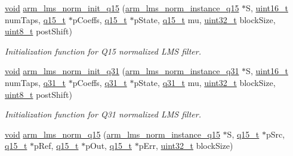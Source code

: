 \begin{DoxyCompactItemize}
\hyperlink{group___n_a_m_e_ga18028b8badbf1ea7e704ccac3c488e82}{void} \hyperlink{group___l_m_s___n_o_r_m_ga213ab1ee2e154cc2fa30d667b1994b89}{arm\-\_\-lms\-\_\-norm\-\_\-init\-\_\-q15} (\hyperlink{structarm__lms__norm__instance__q15}{arm\-\_\-lms\-\_\-norm\-\_\-instance\-\_\-q15} $\ast$S, \hyperlink{stdint_8h_a273cf69d639a59973b6019625df33e30}{uint16\-\_\-t} num\-Taps, \hyperlink{arm__math_8h_ab5a8fb21a5b3b983d5f54f31614052ea}{q15\-\_\-t} $\ast$p\-Coeffs, \hyperlink{arm__math_8h_ab5a8fb21a5b3b983d5f54f31614052ea}{q15\-\_\-t} $\ast$p\-State, \hyperlink{arm__math_8h_ab5a8fb21a5b3b983d5f54f31614052ea}{q15\-\_\-t} mu, \hyperlink{stdint_8h_a435d1572bf3f880d55459d9805097f62}{uint32\-\_\-t} block\-Size, \hyperlink{stdint_8h_aba7bc1797add20fe3efdf37ced1182c5}{uint8\-\_\-t} post\-Shift)
\begin{DoxyCompactList}\small\item\em Initialization function for Q15 normalized L\-M\-S filter. \end{DoxyCompactList}\item 
\hyperlink{group___n_a_m_e_ga18028b8badbf1ea7e704ccac3c488e82}{void} \hyperlink{group___l_m_s___n_o_r_m_ga1d9659dbbea4c89a7a9d14d5fc0dd490}{arm\-\_\-lms\-\_\-norm\-\_\-init\-\_\-q31} (\hyperlink{structarm__lms__norm__instance__q31}{arm\-\_\-lms\-\_\-norm\-\_\-instance\-\_\-q31} $\ast$S, \hyperlink{stdint_8h_a273cf69d639a59973b6019625df33e30}{uint16\-\_\-t} num\-Taps, \hyperlink{arm__math_8h_adc89a3547f5324b7b3b95adec3806bc0}{q31\-\_\-t} $\ast$p\-Coeffs, \hyperlink{arm__math_8h_adc89a3547f5324b7b3b95adec3806bc0}{q31\-\_\-t} $\ast$p\-State, \hyperlink{arm__math_8h_adc89a3547f5324b7b3b95adec3806bc0}{q31\-\_\-t} mu, \hyperlink{stdint_8h_a435d1572bf3f880d55459d9805097f62}{uint32\-\_\-t} block\-Size, \hyperlink{stdint_8h_aba7bc1797add20fe3efdf37ced1182c5}{uint8\-\_\-t} post\-Shift)
\begin{DoxyCompactList}\small\item\em Initialization function for Q31 normalized L\-M\-S filter. \end{DoxyCompactList}\item 
\hyperlink{group___n_a_m_e_ga18028b8badbf1ea7e704ccac3c488e82}{void} \hyperlink{group___l_m_s___n_o_r_m_gad47486a399dedb0bc85a5990ec5cf981}{arm\-\_\-lms\-\_\-norm\-\_\-q15} (\hyperlink{structarm__lms__norm__instance__q15}{arm\-\_\-lms\-\_\-norm\-\_\-instance\-\_\-q15} $\ast$S, \hyperlink{arm__math_8h_ab5a8fb21a5b3b983d5f54f31614052ea}{q15\-\_\-t} $\ast$p\-Src, \hyperlink{arm__math_8h_ab5a8fb21a5b3b983d5f54f31614052ea}{q15\-\_\-t} $\ast$p\-Ref, \hyperlink{arm__math_8h_ab5a8fb21a5b3b983d5f54f31614052ea}{q15\-\_\-t} $\ast$p\-Out, \hyperlink{arm__math_8h_ab5a8fb21a5b3b983d5f54f31614052ea}{q15\-\_\-t} $\ast$p\-Err, \hyperlink{stdint_8h_a435d1572bf3f880d55459d9805097f62}{uint32\-\_\-t} block\-Size)

\end{DoxyCompactItemize}

